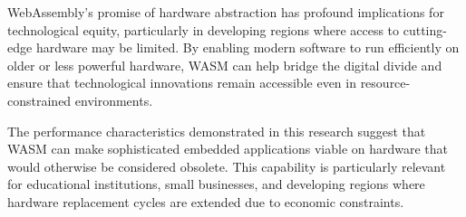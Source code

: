 WebAssembly's promise of hardware abstraction has profound implications for technological equity, particularly in developing regions where access to cutting-edge hardware may be limited. By enabling modern software to run efficiently on older or less powerful hardware, WASM can help bridge the digital divide and ensure that technological innovations remain accessible even in resource-constrained environments.

The performance characteristics demonstrated in this research suggest that WASM can make sophisticated embedded applications viable on hardware that would otherwise be considered obsolete. This capability is particularly relevant for educational institutions, small businesses, and developing regions where hardware replacement cycles are extended due to economic constraints.